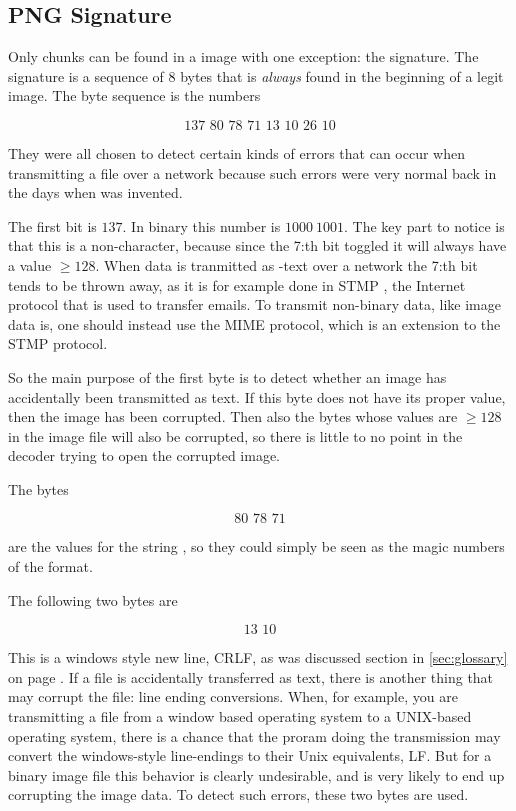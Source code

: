 \subsection{PNG Signature}

Only chunks can be found in a \png image with one exception: the \png
signature. The \png signature is a sequence of 8 bytes that is
\textit{always} found in the beginning of a legit \png image. The byte
sequence is the numbers

\begin{equation*}
  \text{137 80 78 71 13 10 26 10}
\end{equation*}

They were all chosen to detect certain kinds of errors that can occur
when transmitting a \png file over a network because such errors were
very normal back in the days when \png was invented.

The first bit is $137$. In binary this number is $1000\ 1001$. The key
part to notice is that this is a non-\ascii character, because since
the 7:th bit toggled it will always have a value $\ge 128$. When data
is tranmitted as \ascii-text over a network the 7:th bit tends to be
thrown away, as it is for example done in STMP \cite{rfc5321}, the
Internet protocol that is used to transfer emails. To transmit
non-\ascii binary data, like image data is, one should instead use the
MIME protocol, which is an extension to the STMP protocol.

So the main purpose of the first byte is to detect whether an image
has accidentally been transmitted as \ascii text. If this byte does not
have its proper value, then the image has been corrupted. Then also
the bytes whose values are $\ge 128$ in the image file will also be
corrupted, so there is little to no point in the decoder trying to open
the corrupted image.

The bytes

\begin{equation*}
  \text{80 78 71}
\end{equation*}

are the \ascii values for the string \png, so they could simply be seen
as the magic numbers of the \png format.

The following two bytes are

\begin{equation*}
  \text{13 10}
\end{equation*}

This is a windows style new line, CRLF, as was discussed section in
\ref{sec:glossary} on page \pageref{sec:glossary}. If a \png file is
accidentally transferred as text, there is another thing that may
corrupt the file: line ending conversions. When, for example, you are
transmitting a file from a window based operating system to a
UNIX-based operating system, there is a chance that the proram doing
the transmission may convert the windows-style line-endings to their
Unix equivalents, LF. But for a binary image file this behavior is
clearly undesirable, and is very likely to end up corrupting the image
data. To detect such errors, these two bytes are used.

